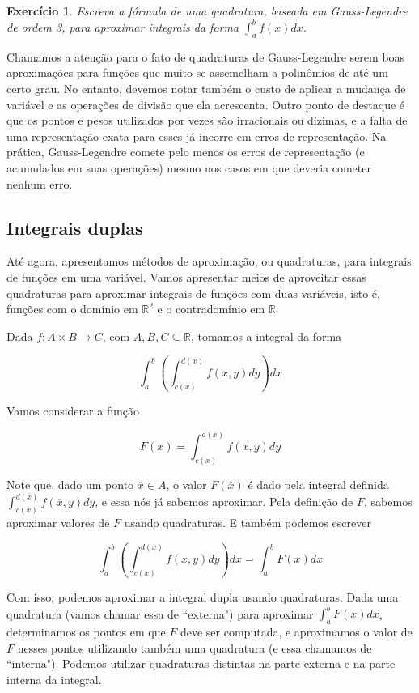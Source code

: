 \documentclass[]{article}
\newtheorem{exercicio}{Exercício}
\numberwithin{equation}{section}
\begin{document}
\begin{exercicio}
  Escreva a fórmula de uma quadratura, baseada em Gauss-Legendre de
  ordem 3, para aproximar integrais da forma $\int_{a}^{b} f(x) dx$.
\end{exercicio}

Chamamos a atenção para o fato de quadraturas de Gauss-Legendre serem
boas aproximações para funções que muito se assemelham a polinômios de
até um certo grau. No entanto, devemos notar também o custo de aplicar
a mudança de variável e as operações de divisão que ela
acrescenta. Outro ponto de destaque é que os pontos e pesos utilizados
por vezes são irracionais ou dízimas, e a falta de uma representação
exata para esses já incorre em erros de representação. Na prática,
Gauss-Legendre comete pelo menos os erros de representação (e
acumulados em suas operações) mesmo nos casos em que deveria cometer
nenhum erro.

\subsection{Integrais duplas}

Até agora, apresentamos métodos de aproximação, ou quadraturas, para integrais de funções em uma variável. Vamos apresentar meios de aproveitar essas quadraturas para aproximar integrais de funções com duas variáveis, isto é, funções com o domínio em $\mathbb{R}^2$ e o contradomínio em $\mathbb{R}$.

Dada $f : A \times B \to C$, com $A, B, C \subseteq \mathbb{R}$, tomamos a integral da forma

$$
\int_{a}^{b} \left(\int_{c(x)}^{d(x)} f(x, y) dy\right) dx
$$

Vamos considerar a função

$$
F(x) = \int_{c(x)}^{d(x)} f(x, y) dy
$$

Note que, dado um ponto $\overline{x} \in A$, o valor $F(\overline{x})$ é dado pela integral definida $\int_{c(\overline{x})}^{d(\overline{x})} f(\overline{x}, y) dy$, e essa nós já sabemos aproximar. Pela definição de $F$, sabemos aproximar valores de $F$ usando quadraturas. E também podemos escrever

$$
\int_{a}^{b} \left(\int_{c(x)}^{d(x)} f(x, y) dy\right) dx = \int_{a}^{b} F(x) dx
$$

Com isso, podemos aproximar a integral dupla usando quadraturas. Dada uma quadratura (vamos chamar essa de ``externa") para aproximar $\int_{a}^{b} F(x) dx$,  determinamos os pontos em que $F$ deve ser computada, e aproximamos o valor de $F$ nesses pontos utilizando também uma quadratura (e essa chamamos de ``interna"). Podemos utilizar quadraturas distintas na parte externa e na parte interna da integral.
\end{document}
